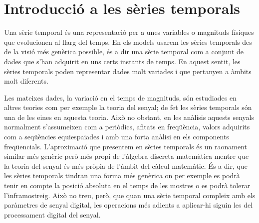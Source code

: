 






\section{Introducció a les sèries temporals}


Una sèrie temporal és una representació per a unes variables o
magnituds físiques que evolucionen al llarg del temps.  En els models
usarem les sèries temporals des de la visió més genèrica possible, és
a dir una sèrie temporal com a conjunt de dades que s'han adquirit en
uns certs instants de temps.  En aquest sentit, les sèries temporals
poden representar dades molt variades i que pertanyen a àmbits molt
diferents.


Les mateixes dades, la variació en el temps de magnituds, són
estudiades en altres teories com per exemple la teoria del senyal; de
fet les sèries temporals són una de les eines en aquesta teoria.  Això
no obstant, en les anàlisis aquests senyals normalment s'assumeixen
com a periòdics, afitats en freqüència, valors adquirits com a
seqüències equiespaiades i amb una forta anàlisi en els components
freqüencials. %
L'aproximació que presentem en sèries temporals és un raonament
similar més genèric però més propi de l'àlgebra discreta matemàtica
mentre que la teoria del senyal és més pròpia de l'àmbit del càlcul
matemàtic. És a dir, que les sèries temporals tindran una forma més
genèrica on per exemple es podrà tenir en compte la posició absoluta
en el temps de les mostres o es podrà tolerar l'inframostreig.  Això
no treu, però, que quan una sèrie temporal compleix amb els paràmetres
de senyal digital, les operacions més adients a aplicar-hi siguin les
del processament digital del senyal.

